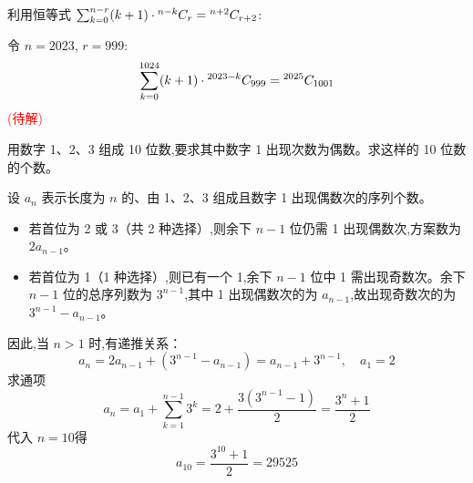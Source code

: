 \begin{questions}
\begin{solution}
利用恒等式 $\sum_{k=0}^{n-r} (k+1) \cdot {}^{n-k}C_{r} = {}^{n+2}C_{r+2}$:

令 $n = 2023$, $r = 999$:
\[
\sum_{k=0}^{1024} (k+1) \cdot {}^{2023-k}C_{999} = {}^{2025}C_{1001}
\]
        \textcolor{red}{(待解)}
    \end{solution}

    \question 用数字 1、2、3 组成 10 位数,要求其中数字 1 出现次数为偶数。求这样的 10 位数的个数。
    \begin{solution}
        设 \(a_n\) 表示长度为 \(n\) 的、由 1、2、3 组成且数字 1 出现偶数次的序列个数。
        \begin{itemize}
            \item 若首位为 2 或 3（共 2 种选择）,则余下 \(n-1\) 位仍需 1 出现偶数次,方案数为 \(2a_{n-1}\)。
            \item 若首位为 1（1 种选择）,则已有一个 1,余下 \(n-1\) 位中 1 需出现奇数次。余下 \(n-1\) 位的总序列数为 \(3^{n-1}\),其中 1 出现偶数次的为 \(a_{n-1}\),故出现奇数次的为 \(3^{n-1} - a_{n-1}\)。
        \end{itemize}
        因此,当 \(n > 1\) 时,有递推关系：
        \[
        a_n = 2a_{n-1} + (3^{n-1} - a_{n-1}) = a_{n-1} + 3^{n-1}, \quad a_1 = 2
        \]
        求通项
        \[
        a_n = a_1 + \sum_{k=1}^{n-1} 3^k =2 + \frac{3(3^{n-1} - 1)}{2}=\frac{3^n + 1}{2}
        \]
        代入 \(n=10\)得
        \[
        a_{10} = \frac{3^{10} + 1}{2} = 29525
        \]
    \end{solution}


\end{questions}

